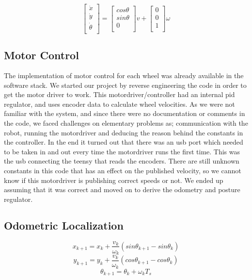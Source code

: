 \documentclass[a4paper,10pt]{article}
\begin{document}
\begin{equation}
	\begin{bmatrix}
	\dot{x}\\ 
	\dot{y}\\
	\dot{\theta}\\  
	\end{bmatrix}
	=
	\begin{bmatrix}
	cos\theta\\ 
	sin\theta\\
	0\\  
	\end{bmatrix}v
	+
	\begin{bmatrix}
	0\\ 
	0\\
	1\\  
	\end{bmatrix}\omega
\end{equation}


\subsection{Motor Control}
	The implementation of motor control for each wheel was already available in the software stack. We started our project by reverse engineering the code in order to get the motor driver to work.
This motordriver/controller had an internal pid regulator, and uses encoder data to calculate wheel velocities. 
	As we were not familiar with the system, and since there were no documentation or comments in the code, we faced challenges on elementary problems as; communication with the robot, running the motordriver and deducing the reason behind the constants in the controller.
In the end it turned out that there was an usb port which needed to be taken in and out every time the motordriver runs the first time. This was the usb connecting the teensy that reads the encoders. There are still unknown constants in this code that has an effect on the published velocity, so we cannot know if this motordriver is publishing correct speeds or not. We ended up assuming that it was correct and moved on to derive the odometry and posture regulator.
	

\subsection{Odometric Localization}

		
		\begin{equation}
		x_{k+1}=x_k+\frac{v_k}{\omega_k}(sin\theta_{k+1}-sin\theta_k)
		\end{equation}
		\begin{equation}
		y_{k+1}=y_k+\frac{v_k}{\omega_k}(cos\theta_{k+1}-cos\theta_k)
		\end{equation}
		\begin{equation}
		\theta_{k+1}=\theta_k+\omega_kT_s
		\end{equation}
\end{document}

